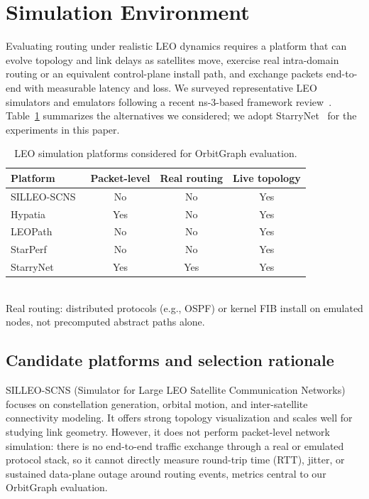 
\section{Simulation Environment}
\label{sec:simulation}

Evaluating routing under realistic LEO dynamics requires a platform that can
evolve topology and link delays as satellites move, exercise real intra-domain
routing or an equivalent control-plane install path, and exchange packets
end-to-end with measurable latency and loss.
We surveyed representative LEO simulators and emulators following a recent
ns-3-based framework review~\cite{manzanareslopez2025comprehensive}.
Table~\ref{tab:simulators} summarizes the alternatives we considered; we adopt
StarryNet~\cite{lai2023starrynet} for the experiments in this paper.

\begin{table}[!h]
  \centering
  \caption{LEO simulation platforms considered for OrbitGraph evaluation.}
  \label{tab:simulators}
  \renewcommand{\arraystretch}{1.15}
  \begin{tabular}{@{}lccc@{}}
    \hline
    Platform & Packet-level & Real routing & Live topology \\
    \hline
    SILLEO-SCNS~\cite{kempton2020silleo}      & No  & No  & Yes \\
    Hypatia~\cite{kassing2020exploring}       & Yes & No  & Yes \\
    LEOPath~\cite{leopath2024}                & No  & No  & Yes \\
    StarPerf~\cite{lai2020starperf}           & No  & No  & Yes \\
    StarryNet~\cite{lai2023starrynet}         & Yes & Yes & Yes \\
    \hline
  \end{tabular}
  \\[0.5em]
  \footnotesize
  Real routing: distributed protocols (e.g., OSPF) or kernel FIB install on
  emulated nodes, not precomputed abstract paths alone.
\end{table}

\subsection{Candidate platforms and selection rationale}

SILLEO-SCNS (Simulator for Large LEO Satellite Communication
Networks)~\cite{kempton2020silleo} focuses on constellation generation, orbital
motion, and inter-satellite connectivity modeling.
It offers strong topology visualization and scales well for studying link
geometry.
However, it does not perform packet-level network simulation: there is no
end-to-end traffic exchange through a real or emulated protocol stack, so it
cannot directly measure round-trip time (RTT), jitter, or sustained data-plane
outage around routing events, metrics central to our OrbitGraph evaluation.

